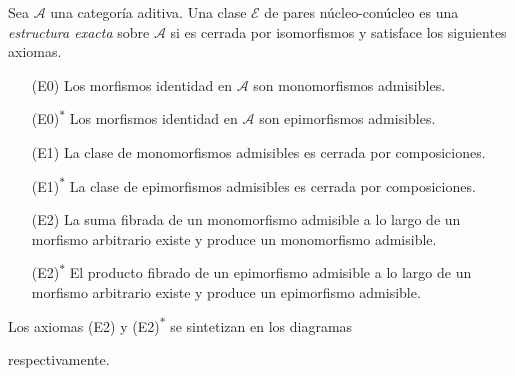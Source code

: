 \documentclass[tesis]{subfiles}
\begin{document}
\begin{Def}\label{Def: Estructura exacta}
    Sea $\mathscr{A}$ una categoría aditiva. Una clase $\mathscr{E}$ de pares núcleo-conúcleo es una \emph{estructura exacta} sobre $\mathscr{A}$ si es cerrada por isomorfismos y satisface los siguientes axiomas. %

    \begin{itemize}
        \item[(E0)] Los morfismos identidad en $\mathscr{A}$ son monomorfismos admisibles. %

        \item[(E0)\textsuperscript{$\ast$}] Los morfismos identidad en $\mathscr{A}$ son epimorfismos admisibles. %

        \item[(E1)] La clase de monomorfismos admisibles es cerrada por composiciones.

        \item[(E1)\textsuperscript{$\ast$}] La clase de epimorfismos admisibles es cerrada por composiciones.

        \item[(E2)] La suma fibrada de un monomorfismo admisible a lo largo de un morfismo arbitrario existe y produce un monomorfismo admisible.

        \item[(E2)\textsuperscript{$\ast$}] El producto fibrado de un epimorfismo admisible a lo largo de un morfismo arbitrario existe y produce un epimorfismo admisible.
    \end{itemize}

    \noindent Los axiomas (E2) y (E2)\textsuperscript{$\ast$} se sintetizan en los diagramas
    \begin{center}
    \end{center}
    respectivamente.
\end{Def}
\end{document}
